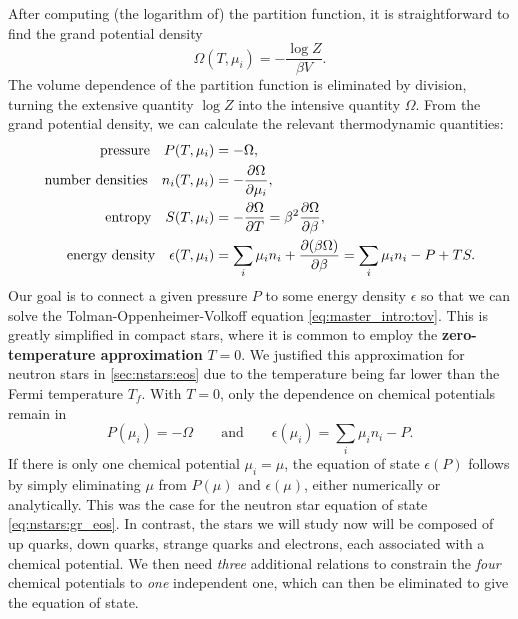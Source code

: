 After computing (the logarithm of) the partition function, it is straightforward to find the grand potential density
\begin{equation}
	\Omega(T, \mu_i) = -\frac{\log Z}{\beta V}.
\label{eq:master_intro:grand_potential}
\end{equation}
The volume dependence of the partition function is eliminated by division, turning the extensive quantity $\log Z$ into the intensive quantity $\Omega$.
From the grand potential density, we can calculate the relevant thermodynamic quantities:
\begin{subequations}
\begin{align}
	\text{pressure} \quad P(T, \mu_i) &= -\Omega, \label{eq:master_intro:pressure} \\
	\text{number densities} \quad n_i(T, \mu_i) &= -\pdv{\Omega}{\mu_i}, \label{eq:master_intro:densities} \\
	\text{entropy} \quad S(T, \mu_i) &= -\pdv{\Omega}{T} = \beta^2 \pdv{\Omega}{\beta}, \label{eq:master_intro:entropy} \\
	\text{energy density} \quad \epsilon(T, \mu_i) &= \sum_i \mu_i n_i + \pdv{(\beta \Omega)}{\beta} = \sum_i \mu_i n_i - P + T S. \label{eq:master_intro:energy_density}
\end{align}
\end{subequations}
Our goal is to connect a given pressure $P$ to some energy density $\epsilon$ so that we can solve the Tolman-Oppenheimer-Volkoff equation \eqref{eq:master_intro:tov}.
This is greatly simplified in compact stars, where it is common to employ the \textbf{zero-temperature approximation} $T=0$.
We justified this approximation for neutron stars in \cref{sec:nstars:eos} due to the temperature being far lower than the Fermi temperature $T_f$.
With $T = 0$, only the dependence on chemical potentials remain in
\begin{equation}
	P(\mu_i) = -\Omega
	\qquad \text{and} \qquad
	\epsilon(\mu_i) = \sum_i \mu_i n_i - P.
\end{equation}
If there is only one chemical potential $\mu_i = \mu$,
the equation of state $\epsilon(P)$ follows by simply eliminating $\mu$ from $P(\mu)$ and $\epsilon(\mu)$, either numerically or analytically.
This was the case for the neutron star equation of state \eqref{eq:nstars:gr_eos}.
In contrast, the stars we will study now will be composed of up quarks, down quarks, strange quarks and electrons, each associated with a chemical potential.
We then need \emph{three} additional relations to constrain the \emph{four} chemical potentials to \emph{one} independent one, which can then be eliminated to give the equation of state.

